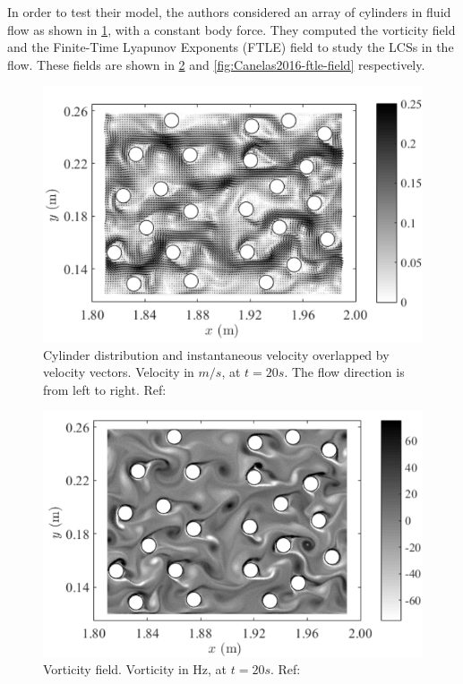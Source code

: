 In order to test their model, the authors considered an array of cylinders in fluid flow as shown in \ref{fig:Canelas2016-vel-field}, with a constant body force. They computed the vorticity field and the Finite-Time Lyapunov Exponents (FTLE) field to study the LCSs in the flow. These fields are shown in \ref{fig:Canelas2016-vorticity-field} and \ref{fig:Canelas2016-ftle-field} respectively.
\begin{figure}[h!]
	\centering
	\includegraphics{Figures/research_papers/Canelas2016-vel-field.png}
	\caption{Cylinder distribution and instantaneous velocity overlapped by velocity vectors. Velocity in $m/s$, at $t=20s$. The flow direction is from left to right. Ref: \parencite{Canelas2016}}
	\label{fig:Canelas2016-vel-field}
\end{figure}
\begin{figure}[h!]
	\centering
	\includegraphics{Figures/research_papers/Canelas2016-vorticity-field.png}
	\caption{Vorticity field. Vorticity in Hz, at $t = 20s$. Ref: \parencite{Canelas2016}}
	\label{fig:Canelas2016-vorticity-field}
\end{figure}
